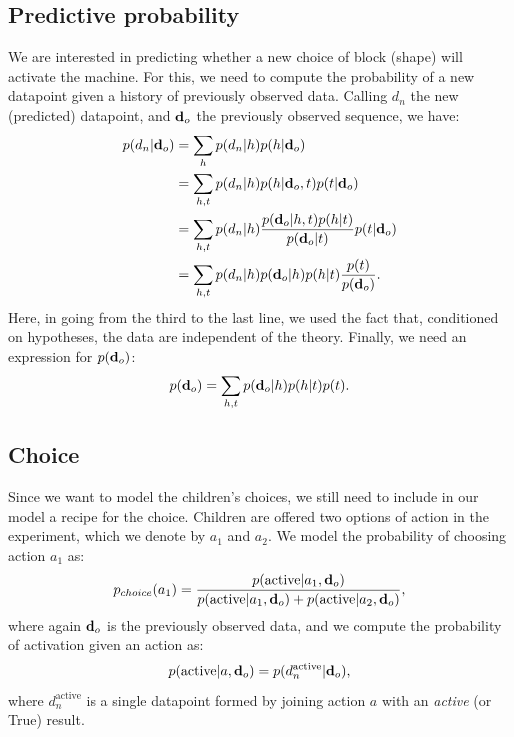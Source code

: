 \documentclass[11pt, a4paper]{article}
\begin{document}
\subsection*{Predictive probability}
We are interested in predicting whether a new choice of block (shape) will activate the machine. For this, we need to compute the probability of a new datapoint given a history of previously observed data. Calling $d_n$ the new (predicted) datapoint, and $\textbf d_o$ the previously observed sequence, we have:
\begin{equation}
\begin{split}
p(d_n|\textbf d_o)&=\sum_h p(d_n|h)p(h|\textbf d_o)\\
&=\sum_{h,t} p(d_n|h) p(h|\textbf d_o, t) p(t|\textbf d_o)\\
&=\sum_{h,t} p(d_n|h) \frac{p(\textbf d_o| h, t) p(h|t)}{p(\textbf d_o|t)} p(t|\textbf d_o)\\
&=\sum_{h,t} p(d_n|h) p(\textbf d_o| h) p(h|t)\frac{p(t)}{p(\textbf d_o)}.
\end{split}
\end{equation}
Here, in going from the third to the last line, we used the fact that, conditioned on hypotheses, the data are independent of the theory. Finally, we need an expression for $p(\textbf d_o)$:
\begin{equation}
p(\textbf d_o)=\sum_{h,t} p(\textbf d_o|h) p(h|t) p(t).
\end{equation}
 
\subsection*{Choice}
Since we want to model the children's choices, we still need to include in our model a recipe for the choice. Children are offered two options of action in the experiment, which we denote by $a_1$ and $a_2$. We model the probability of choosing action $a_1$ as:
\begin{equation}
p_{choice}(a_1)=\frac{p(\textrm{active}|a_1,\textbf d_o)}{p(\textrm{active}|a_1,\textbf d_o)+p(\textrm{active}|a_2,\textbf d_o)},
\end{equation} 
where again $\textbf d_o$ is the previously observed data, and we compute the probability of activation given an action as:
\begin{equation}
p(\textrm{active}|a,\textbf d_o)= p(d^{\textrm{active}}_n|\textbf d_o),
\end{equation}
where $d^{\textrm{active}}_n$ is a single datapoint formed by joining action $a$ with an \emph{active} (or True) result.
 
\end{document}
